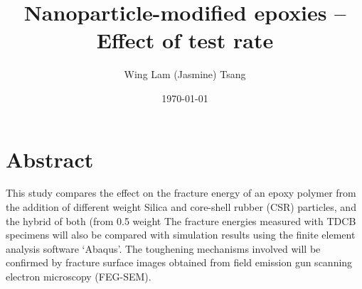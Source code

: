 \documentclass[numbers=noendperiod,chapterprefix=on]{icldt} %
\newcommand{\HRule}{\rule{\linewidth}{0.5mm}}
\begin{document}
\title{Nanoparticle-modified epoxies – Effect of test rate}
\author{Wing Lam (Jasmine) Tsang}
\date{\today}

\maketitle
\newpage


\chapter*{Abstract}

This study compares the effect on the fracture energy of an epoxy polymer from the addition of different weight %
Silica and core-shell rubber (CSR) particles, and the hybrid of both (from 0.5 weight %
The fracture energies measured with TDCB specimens will also be compared with simulation results using the finite element analysis software ‘Abaqus’. The toughening mechanisms involved will be confirmed by fracture surface images obtained from field emission gun scanning electron microscopy (FEG-SEM). 
\end{document}
